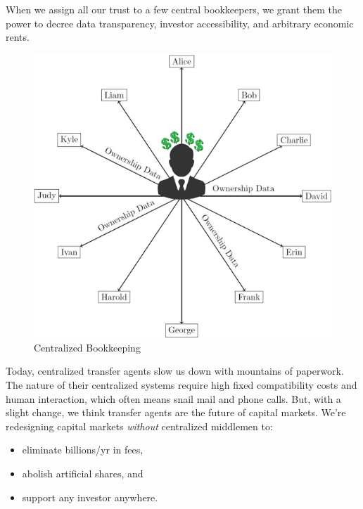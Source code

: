 \documentclass[11pt, english]{article}
\begin{document}
\begin{multicols}{2}

When we assign all our trust to a few central bookkeepers, we grant them the power to decree data transparency, investor accessibility, and arbitrary economic rents.

\begin{figure}[H]
    \raggedleft 
    \includegraphics[width=\linewidth]{centralized.png}
    \caption{Centralized Bookkeeping}
    \label{fig:centralized}
\end{figure}

Today, centralized transfer agents slow us down with mountains of paperwork. The nature of their centralized systems require high fixed compatibility costs and human interaction, which often means snail mail and phone calls. But, with a slight change, we think transfer agents are the future of capital markets. We're redesigning capital markets \hbox{\textit{without}} centralized middlemen to:
\begin{itemize}
    \item eliminate billions/yr in fees,
    
    \item abolish artificial shares, and
    
    \item support any investor anywhere.
\end{itemize}




\end{multicols}
\end{document}
